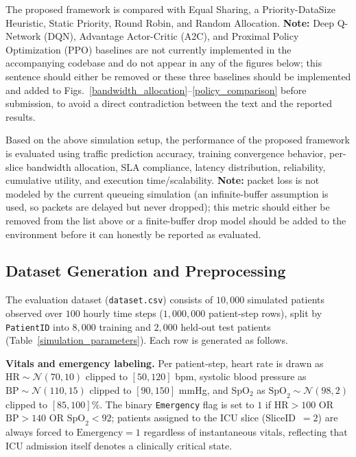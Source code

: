 \documentclass[10pt,journal,compsoc]{IEEEtran}
\begin{document}
The proposed framework is compared with Equal Sharing, a Priority-DataSize Heuristic, Static Priority, Round Robin, and Random Allocation. \textbf{Note:} Deep Q-Network (DQN), Advantage Actor-Critic (A2C), and Proximal Policy Optimization (PPO) baselines are not currently implemented in the accompanying codebase and do not appear in any of the figures below; this sentence should either be removed or these three baselines should be implemented and added to Figs.~\ref{bandwidth_allocation}--\ref{policy_comparison} before submission, to avoid a direct contradiction between the text and the reported results.

Based on the above simulation setup, the performance of the proposed framework is evaluated using traffic prediction accuracy, training convergence behavior, per-slice bandwidth allocation, SLA compliance, latency distribution, reliability, cumulative utility, and execution time/scalability. \textbf{Note:} packet loss is not modeled by the current queueing simulation (an infinite-buffer assumption is used, so packets are delayed but never dropped); this metric should either be removed from the list above or a finite-buffer drop model should be added to the environment before it can honestly be reported as evaluated.


 
\subsection{Dataset Generation and Preprocessing}
\label{DataGen}
 
The evaluation dataset (\texttt{dataset.csv}) consists of $10{,}000$ simulated
patients observed over $100$ hourly time steps ($1{,}000{,}000$ patient-step
rows), split by \texttt{PatientID} into $8{,}000$ training and $2{,}000$
held-out test patients (Table~\ref{simulation_parameters}). Each row is
generated as follows.
 
\textbf{Vitals and emergency labeling.} Per patient-step, heart rate is drawn
as $\mathrm{HR}\sim\mathcal{N}(70,10)$ clipped to $[50,120]$ bpm, systolic
blood pressure as $\mathrm{BP}\sim\mathcal{N}(110,15)$ clipped to $[90,150]$
mmHg, and SpO$_2$ as $\mathrm{SpO}_2\sim\mathcal{N}(98,2)$ clipped to
$[85,100]\%$. The binary \texttt{Emergency} flag is set to $1$ if
$\mathrm{HR}>100$ OR $\mathrm{BP}>140$ OR $\mathrm{SpO}_2<92$; patients
assigned to the ICU slice (SliceID~$=2$) are always forced to
$\mathrm{Emergency}=1$ regardless of instantaneous vitals, reflecting that ICU
admission itself denotes a clinically critical state.
 
\end{document}
